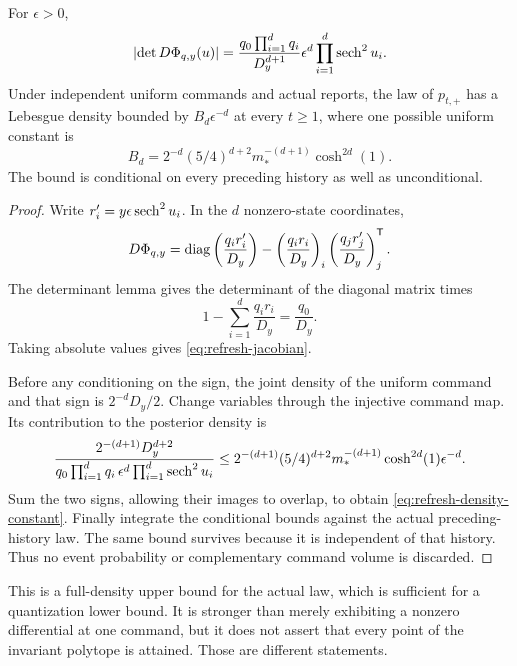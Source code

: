 \begin{lemma}\label{lem:refresh-density}
For $\epsilon>0$,
\begin{equation}\label{eq:refresh-jacobian}
 \left|\det D\Phi_{q,y}(u)\right|
 =\frac{q_0\prod_{i=1}^dq_i}{D_y^{d+1}}
       \epsilon^d\prod_{i=1}^d\operatorname{sech}^2u_i.
\end{equation}
Under independent uniform commands and actual reports, the law of
$p_{t,+}$ has a Lebesgue density bounded by $B_d\epsilon^{-d}$ at every
$t\ge1$, where one possible uniform constant is
\begin{equation}\label{eq:refresh-density-constant}
 B_d=2^{-d}(5/4)^{d+2}m_*^{-(d+1)}\cosh^{2d}(1).
\end{equation}
The bound is conditional on every preceding history as well as
unconditional.
\end{lemma}
\begin{proof}
Write $r_i'=y\epsilon\operatorname{sech}^2u_i$. In the $d$ nonzero-state coordinates,
\[
 D\Phi_{q,y}
 =\operatorname{diag}\left(\frac{q_ir_i'}{D_y}\right)
      -\left(\frac{q_ir_i}{D_y}\right)_i
       \left(\frac{q_jr_j'}{D_y}\right)_j^{\mathsf T}.
\]
The determinant lemma gives the determinant of the diagonal matrix times
\[
 1-\sum_{i=1}^d\frac{q_ir_i}{D_y}=\frac{q_0}{D_y}.
\]
Taking absolute values gives \eqref{eq:refresh-jacobian}.

Before any conditioning on the sign, the joint density of the uniform
command and that sign is
$2^{-d}D_y/2$. Change variables through the injective command map. Its
contribution to the posterior density is
\[
 \frac{2^{-(d+1)}D_y^{d+2}}
 {q_0\prod_{i=1}^dq_i\,\epsilon^d\prod_{i=1}^d\operatorname{sech}^2u_i}
 \le 2^{-(d+1)}(5/4)^{d+2}
        m_*^{-(d+1)}\cosh^{2d}(1)\epsilon^{-d}.
\]
Sum the two signs, allowing their images to overlap, to obtain
\eqref{eq:refresh-density-constant}. Finally integrate the conditional
bounds against the actual preceding-history law. The same bound survives
because it is independent of that history. Thus no event probability or
complementary command volume is discarded.
\end{proof}

This is a full-density upper bound for the actual law, which is sufficient
for a quantization lower bound. It is stronger than merely exhibiting a
nonzero differential at one command, but it does not assert that every
point of the invariant polytope is attained. Those are different statements.

